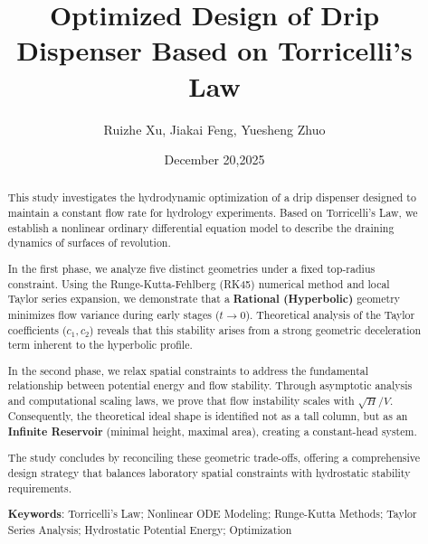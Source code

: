 \documentclass[a4paper, 12pt]{article}
\title{\textbf{Optimized Design of Drip Dispenser Based on Torricelli's Law}}
\author{Ruizhe Xu, Jiakai Feng, Yuesheng Zhuo}
\date{December 20,2025}
\begin{document}
\maketitle
\thispagestyle{empty}

\begin{abstract}
    This study investigates the hydrodynamic optimization of a drip dispenser designed to maintain a constant flow rate for hydrology experiments. Based on Torricelli's Law, we establish a nonlinear ordinary differential equation model to describe the draining dynamics of surfaces of revolution.
    
    In the first phase, we analyze five distinct geometries under a fixed top-radius constraint. Using the Runge-Kutta-Fehlberg (RK45) numerical method and local Taylor series expansion, we demonstrate that a \textbf{Rational (Hyperbolic)} geometry minimizes flow variance during early stages ($t \to 0$). Theoretical analysis of the Taylor coefficients ($c_1, c_2$) reveals that this stability arises from a strong geometric deceleration term inherent to the hyperbolic profile.
    
    In the second phase, we relax spatial constraints to address the fundamental relationship between potential energy and flow stability. Through asymptotic analysis and computational scaling laws, we prove that flow instability scales with $\sqrt{H}/V$. Consequently, the theoretical ideal shape is identified not as a tall column, but as an \textbf{Infinite Reservoir} (minimal height, maximal area), creating a constant-head system.
    
    The study concludes by reconciling these geometric trade-offs, offering a comprehensive design strategy that balances laboratory spatial constraints with hydrostatic stability requirements.

    \vspace{0.5em}
    \noindent \textbf{Keywords}: Torricelli's Law; Nonlinear ODE Modeling; Runge-Kutta Methods; Taylor Series Analysis; Hydrostatic Potential Energy; Optimization
\end{abstract}
\end{document}
